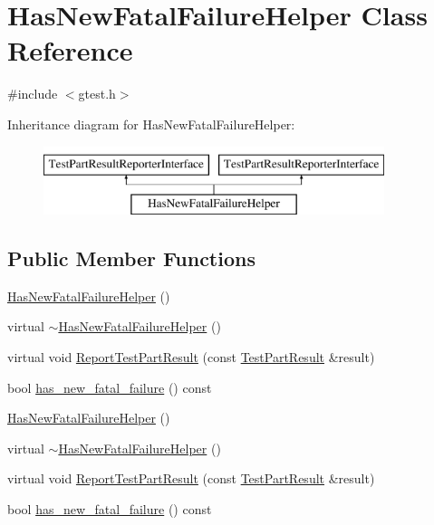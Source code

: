 \hypertarget{classtesting_1_1internal_1_1HasNewFatalFailureHelper}{\section{\-Has\-New\-Fatal\-Failure\-Helper \-Class \-Reference}
\label{da/dba/classtesting_1_1internal_1_1HasNewFatalFailureHelper}
}


{\ttfamily \#include $<$gtest.\-h$>$}

\-Inheritance diagram for \-Has\-New\-Fatal\-Failure\-Helper\-:\begin{figure}[H]
\begin{center}
\leavevmode
\includegraphics[height=2.000000cm]{da/dba/classtesting_1_1internal_1_1HasNewFatalFailureHelper}
\end{center}
\end{figure}
\subsection*{\-Public \-Member \-Functions}
\begin{DoxyCompactItemize}
\item 
\hyperlink{classtesting_1_1internal_1_1HasNewFatalFailureHelper_a261bc4cd55c6bd4e33a90effb7c3b56c}{\-Has\-New\-Fatal\-Failure\-Helper} ()
\item 
virtual \hyperlink{classtesting_1_1internal_1_1HasNewFatalFailureHelper_ad686cd16900a0b971427c790c1375ef7}{$\sim$\-Has\-New\-Fatal\-Failure\-Helper} ()
\item 
virtual void \hyperlink{classtesting_1_1internal_1_1HasNewFatalFailureHelper_acd54d55b39f168c91b6370be62cef448}{\-Report\-Test\-Part\-Result} (const \hyperlink{classtesting_1_1TestPartResult}{\-Test\-Part\-Result} \&result)
\item 
bool \hyperlink{classtesting_1_1internal_1_1HasNewFatalFailureHelper_a2e7355dbd8b1a4d5d81f180a709e629b}{has\-\_\-new\-\_\-fatal\-\_\-failure} () const 
\item 
\hyperlink{classtesting_1_1internal_1_1HasNewFatalFailureHelper_a261bc4cd55c6bd4e33a90effb7c3b56c}{\-Has\-New\-Fatal\-Failure\-Helper} ()
\item 
virtual \hyperlink{classtesting_1_1internal_1_1HasNewFatalFailureHelper_a67b8acdd478d9cb03fb9424a22efb8f9}{$\sim$\-Has\-New\-Fatal\-Failure\-Helper} ()
\item 
virtual void \hyperlink{classtesting_1_1internal_1_1HasNewFatalFailureHelper_a8662b990bc0a42bbe9fba3cded22d79e}{\-Report\-Test\-Part\-Result} (const \hyperlink{classtesting_1_1TestPartResult}{\-Test\-Part\-Result} \&result)
\item 
bool \hyperlink{classtesting_1_1internal_1_1HasNewFatalFailureHelper_a2e7355dbd8b1a4d5d81f180a709e629b}{has\-\_\-new\-\_\-fatal\-\_\-failure} () const 
\end{DoxyCompactItemize}
